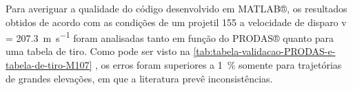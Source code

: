 Para averiguar a qualidade do código desenvolvido em MATLAB®, os resultados obtidos de acordo com as condições de um projetil \qty{155}{\millimetre} a velocidade de disparo v = \qty{207,3}{\metre\per\second} foram analisadas tanto em função do PRODAS® quanto para uma tabela de tiro. Como pode ser visto na \autoref{tab:tabela-validacao-PRODAS-e-tabela-de-tiro-M107} \cite{Thallyo2022}, os erros foram superiores a \qty{1}{\percent} somente para trajetórias de grandes elevações, em que a literatura prevê inconsistências.

\begin{table}[ht]
    \centering
    \caption[Resultados obtidos durante a validação (munição \qty{155}{\millimetre} M107)]{Resultados obtidos durante a validação (munição \qty{155}{\millimetre} M107)}
    \vspace{0.5cm}
\end{table}
